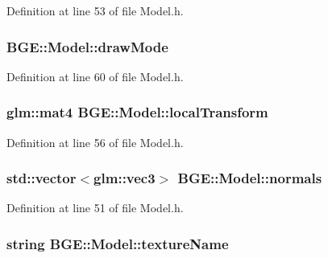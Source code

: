 Definition at line 53 of file Model.\-h.

\hypertarget{class_b_g_e_1_1_model_a7ff9d0fadd85be1fcbd0cd254c3e23ee}{
\subsubsection[{draw\-Mode}]{ B\-G\-E\-::\-Model\-::draw\-Mode}}\label{class_b_g_e_1_1_model_a7ff9d0fadd85be1fcbd0cd254c3e23ee}


Definition at line 60 of file Model.\-h.

\hypertarget{class_b_g_e_1_1_model_acfafbb8464feb0aa8695c9ec53407601}{
\subsubsection[{local\-Transform}]{\setlength{\rightskip}{0pt plus 5cm}glm\-::mat4 B\-G\-E\-::\-Model\-::local\-Transform}}\label{class_b_g_e_1_1_model_acfafbb8464feb0aa8695c9ec53407601}


Definition at line 56 of file Model.\-h.

\hypertarget{class_b_g_e_1_1_model_ac2e15ec05b6327a4a93c87d487e51c60}{
\subsubsection[{normals}]{\setlength{\rightskip}{0pt plus 5cm}std\-::vector$<$glm\-::vec3$>$ B\-G\-E\-::\-Model\-::normals}}\label{class_b_g_e_1_1_model_ac2e15ec05b6327a4a93c87d487e51c60}


Definition at line 51 of file Model.\-h.

\hypertarget{class_b_g_e_1_1_model_acaed7dd09ab85e191e342d96e54793e9}{
\subsubsection[{texture\-Name}]{\setlength{\rightskip}{0pt plus 5cm}string B\-G\-E\-::\-Model\-::texture\-Name}}\label{class_b_g_e_1_1_model_acaed7dd09ab85e191e342d96e54793e9}


